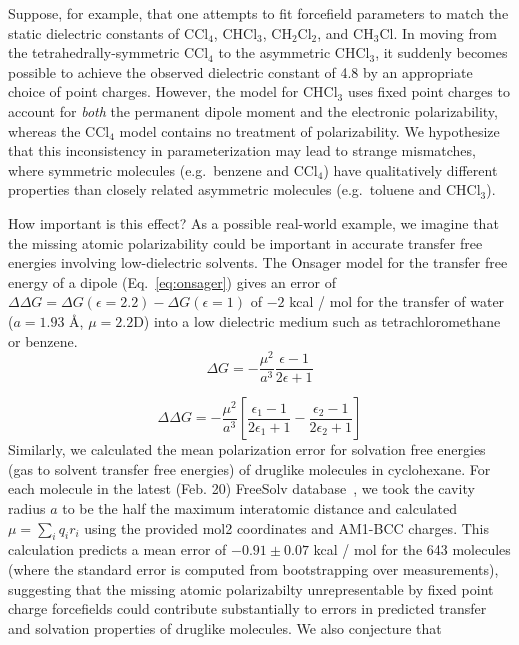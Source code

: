\documentclass[aps,pre,twocolumn,nofootinbib,superscriptaddress,linenumbers]{revtex4-1}
\begin{document}

Suppose, for example, that one attempts to fit forcefield parameters to match the static dielectric constants of $\mathrm{CCl_4}$, $\mathrm{CHCl_3}$, $\mathrm{CH_2Cl_2}$, and $\mathrm{CH_3Cl}$.
In moving from the tetrahedrally-symmetric $\mathrm{CCl_4}$ to the asymmetric $\mathrm{CHCl_3}$, it suddenly becomes possible to achieve the observed dielectric constant of 4.8 by an appropriate choice of point charges.
However, the model for $\mathrm{CHCl_3}$ uses fixed point charges to account for \emph{both} the permanent dipole moment and the electronic polarizability, whereas the $\mathrm{CCl_4}$ model contains no treatment of polarizability.  
We hypothesize that this inconsistency in parameterization may lead to strange mismatches, where symmetric molecules (e.g.~benzene and $\mathrm{CCl_4}$) have qualitatively different properties than closely related asymmetric molecules (e.g.~toluene and $\mathrm{CHCl_3}$).

How important is this effect?
As a possible real-world example, we imagine that the missing atomic polarizability could be important in accurate transfer free energies involving low-dielectric solvents.  
The Onsager model for the transfer free energy of a dipole (Eq.~\ref{eq:onsager}) gives an error of $\Delta \Delta G = \Delta G(\epsilon=2.2) - \Delta G(\epsilon=1)$ of $-2$ kcal / mol for the transfer of water ($a = 1.93$ \AA, $\mu = 2.2$D) into a low dielectric medium such as tetrachloromethane or benzene.  
\begin{equation} \label{eq:onsager}
\Delta G = -\frac{\mu^2}{a^3}\frac{\epsilon - 1}{2 \epsilon + 1}
\end{equation}

\begin{equation} \label{eq:onsager2}
\Delta \Delta G = -\frac{\mu^2}{a^3}[\frac{\epsilon_1 - 1}{2 \epsilon_1 + 1} - \frac{\epsilon_2 - 1}{2 \epsilon_2 + 1}]
\end{equation}
Similarly, we calculated the mean polarization error for solvation free energies (gas to solvent transfer free energies) of druglike molecules in cyclohexane.  
For each molecule in the latest (Feb. 20) FreeSolv database~\cite{freesolv, freesolv_github}, we took the cavity radius $a$ to be the half the maximum interatomic distance and calculated $\mu = \sum_i q_i r_i$ using the provided mol2 coordinates and AM1-BCC charges.  
This calculation predicts a mean error of $-0.91 \pm0.07$ kcal / mol for the 643 molecules (where the standard error is computed from bootstrapping over measurements), 
suggesting that the missing atomic polarizabilty unrepresentable by fixed point charge forcefields could contribute substantially to errors in predicted transfer and solvation properties of druglike molecules.  
We also conjecture that 
\end{document}
